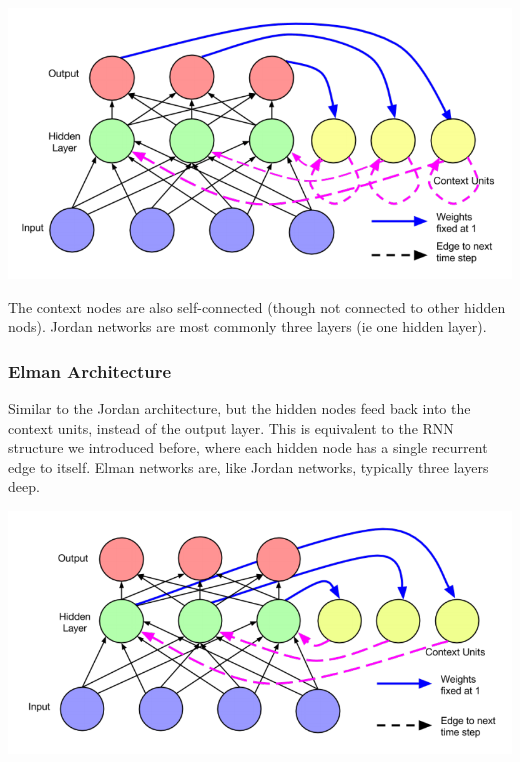 \documentclass{article}
\begin{document}
\begin{center}
    \includegraphics[scale=0.35]{images/jordan_rnn.png}
\end{center}

The context nodes are also self-connected (though not connected to other hidden nods). Jordan networks are most commonly three layers (ie one hidden layer).

\subsubsection{Elman Architecture}
Similar to the Jordan architecture, but the hidden nodes feed back into the context units, instead of the output layer. This is equivalent to the RNN structure we introduced before, where each hidden node has a single recurrent edge to itself. Elman networks are, like Jordan networks, typically three layers deep.

\begin{center}
    \includegraphics[scale=0.35]{images/elman_rnn.png}
\end{center}
\end{document}
